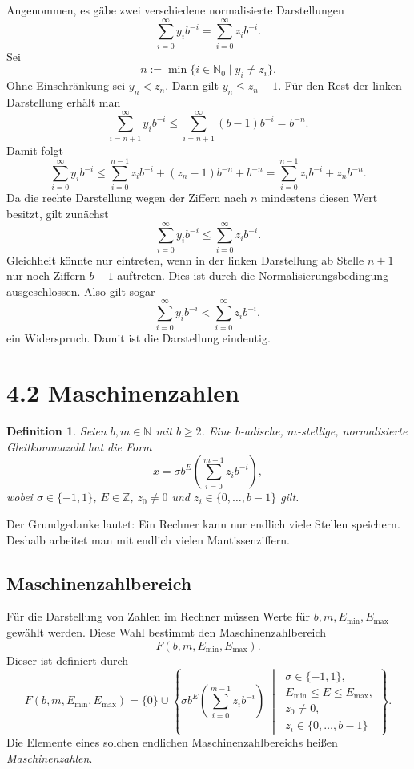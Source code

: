 \documentclass{article}
\newcommand{\Z}{\mathbb{Z}}
\newcommand{\N}{\mathbb{N}}
\newtheorem{defn}[thm]{Definition}
\begin{document}
Angenommen, es gäbe zwei verschiedene normalisierte Darstellungen
\[
\sum_{i=0}^{\infty}y_i b^{-i}
=
\sum_{i=0}^{\infty}z_i b^{-i}.
\]
Sei
\[
n:=\min\{i\in\N_0\mid y_i\neq z_i\}.
\]
Ohne Einschränkung sei \(y_n<z_n\). Dann gilt \(y_n\leq z_n-1\). Für den Rest der linken Darstellung erhält man
\[
\sum_{i=n+1}^{\infty}y_i b^{-i}
\leq
\sum_{i=n+1}^{\infty}(b-1)b^{-i}
=
b^{-n}.
\]
Damit folgt
\[
\sum_{i=0}^{\infty}y_i b^{-i}
\leq
\sum_{i=0}^{n-1}z_i b^{-i}
+
(z_n-1)b^{-n}
+
b^{-n}
=
\sum_{i=0}^{n-1}z_i b^{-i}
+
z_n b^{-n}.
\]
Da die rechte Darstellung wegen der Ziffern nach \(n\) mindestens diesen Wert besitzt, gilt zunächst
\[
\sum_{i=0}^{\infty}y_i b^{-i}
\leq
\sum_{i=0}^{\infty}z_i b^{-i}.
\]
Gleichheit könnte nur eintreten, wenn in der linken Darstellung ab Stelle \(n+1\) nur noch Ziffern \(b-1\) auftreten. Dies ist durch die Normalisierungsbedingung ausgeschlossen. Also gilt sogar
\[
\sum_{i=0}^{\infty}y_i b^{-i}
<
\sum_{i=0}^{\infty}z_i b^{-i},
\]
ein Widerspruch. Damit ist die Darstellung eindeutig.

\section{4.2 Maschinenzahlen}

\begin{defn}
Seien \(b,m\in\N\) mit \(b\geq 2\). Eine \(b\)-adische, \(m\)-stellige, normalisierte Gleitkommazahl hat die Form
\[
x=\sigma b^E\left(\sum_{i=0}^{m-1}z_i b^{-i}\right),
\]
wobei \(\sigma\in\{-1,1\}\), \(E\in\Z\), \(z_0\neq 0\) und \(z_i\in\{0,\dots,b-1\}\) gilt.
\end{defn}

Der Grundgedanke lautet: Ein Rechner kann nur endlich viele Stellen speichern. Deshalb arbeitet man mit endlich vielen Mantissenziffern.

\subsection*{Maschinenzahlbereich}

Für die Darstellung von Zahlen im Rechner müssen Werte für \(b,m,E_{\min},E_{\max}\) gewählt werden. Diese Wahl bestimmt den Maschinenzahlbereich
\[
F(b,m,E_{\min},E_{\max}).
\]
Dieser ist definiert durch
\[
F(b,m,E_{\min},E_{\max})
=
\{0\}\cup
\left\{
\sigma b^E
\left(\sum_{i=0}^{m-1}z_i b^{-i}\right)
\;\middle|\;
\begin{array}{l}
\sigma\in\{-1,1\},\\
E_{\min}\leq E\leq E_{\max},\\
z_0\neq 0,\\
z_i\in\{0,\dots,b-1\}
\end{array}
\right\}.
\]
Die Elemente eines solchen endlichen Maschinenzahlbereichs heißen \emph{Maschinenzahlen}.
\end{document}
